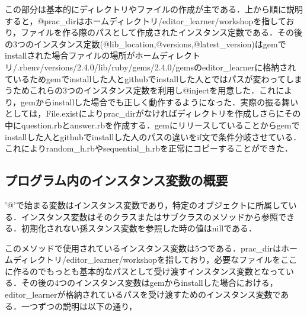 この部分は基本的にディレクトリやファイルの作成が主である．上から順に説明すると，@prac\_dirはホームディレクトリ/editor\_learner/workshopを指しており，ファイルを作る際のパスとして作成されたインスタンス定数である．その後の3つのインスタンス定数(@lib\_location,@versions,@latest\_version)はgemでinstallされた場合ファイルの場所がホームディレクトリ/.rbenv/versions/2.4.0/lib/ruby/gems/2.4.0/gemsのeditor\_learnerに格納されているためgemでinstallした人とgithubでinstallした人とではパスが変わってしまうためこれらの3つのインスタンス定数を利用し@injectを用意した．これにより，gemからinstallした場合でも正しく動作するようになった．実際の振る舞いとしては，File.existによりprac\_dirがなければディレクトリを作成しさらにその中にquestion.rbとanswer.rbを作成する．gemにリリースしていることからgemでinstallした人とgithubでinstallした人のパスの違いをif文で条件分岐させている．これによりrandom\_h.rbやsequential\_h.rbを正常にコピーすることができた．

\subsection{プログラム内のインスタンス変数の概要}\label{ux30d7ux30edux30b0ux30e9ux30e0ux5185ux306eux30a4ux30f3ux30b9ux30bfux30f3ux30b9ux5909ux6570ux306eux6982ux8981}

'@'で始まる変数はインスタンス変数であり，特定のオブジェクトに所属している．インスタンス変数はそのクラスまたはサブクラスのメソッドから参照できる．初期化されない孫スタンス変数を参照した時の値はnillである．

このメソッドで使用されているインスタンス変数は5つである．prac\_dirはホームディレクトリ/editor\_learner/workshopを指しており，必要なファイルをここに作るのでもっとも基本的なパスとして受け渡すインスタンス変数となっている．その後の4つのインスタンス変数はgemからinstallした場合における，editor\_learnerが格納されているパスを受け渡すためのインスタンス変数である．一つずつの説明は以下の通り，

